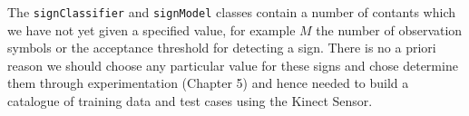 The \verb|signClassifier| and \verb|signModel| classes contain a number of contants which we have not yet given a specified value, for example $M$ the number of observation symbols or the acceptance threshold for detecting a sign. There is no a priori reason we should choose any particular value for these signs and chose determine them through experimentation (Chapter 5) and hence needed to build a catalogue of training data and test cases using the Kinect Sensor.

